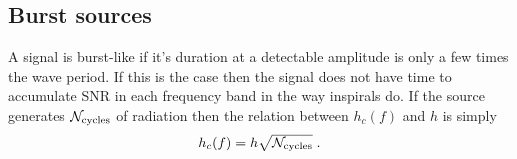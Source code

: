 \subsection{Burst sources}\label{sec:bursts}


A signal is burst-like if it's duration at a detectable amplitude is only a few times the wave period. If this is the case then the signal does not have time to accumulate SNR in each frequency band in the way inspirals do. If the source generates ${\cal{N}}_{\textrm{cycles}}$ of radiation then the relation between $h_{c}(f)$ and $h$ is simply
\begin{equation}\label{eq:simple} h_{c}(f)=h\sqrt{{\cal{N}}_{\textrm{cycles}}} \; . \end{equation}

